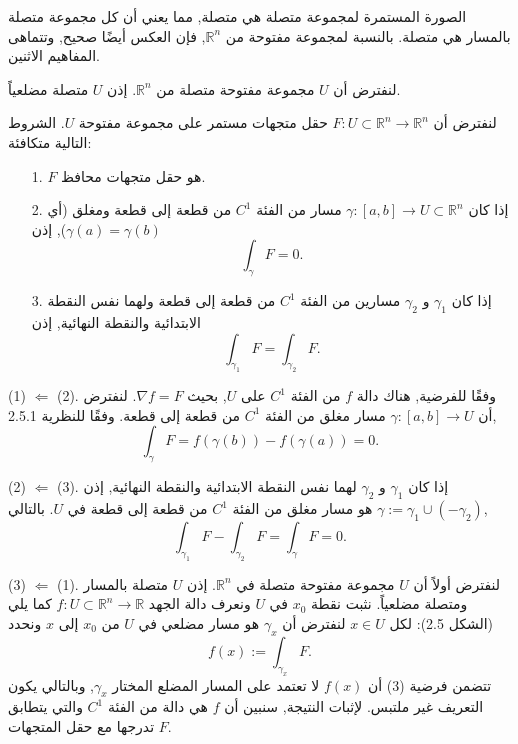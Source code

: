 الصورة المستمرة لمجموعة متصلة هي متصلة, مما يعني أن كل مجموعة متصلة بالمسار هي متصلة. بالنسبة لمجموعة مفتوحة من \( \mathbb{R}^n \), فإن العكس أيضًا صحيح, وتتماهى المفاهيم الاثنين.

\begin{theoreme}[النظرية 2.5.2]
   
لنفترض أن \( U \) مجموعة مفتوحة متصلة من \( \mathbb{R}^n \). إذن \( U \) متصلة مضلعياً.
\end{theoreme}

\begin{theoreme}[النظرية 2.5.3]
    
لنفترض أن \( F : U \subset \mathbb{R}^n \to \mathbb{R}^n \) حقل متجهات مستمر على مجموعة مفتوحة \( U \). الشروط التالية متكافئة:
\begin{enumerate}
    \item [1.] \( F \) هو حقل متجهات محافظ.
    \item [2.] إذا كان \( \gamma : [a, b] \to U \subset \mathbb{R}^n \) مسار من الفئة \( C^1 \) من قطعة إلى قطعة ومغلق (أي \( \gamma(a) = \gamma(b) \)), إذن
    \[ \int_\gamma F = 0. \]
    \item [3.] إذا كان \( \gamma_1 \) و \( \gamma_2 \) مسارين من الفئة \( C^1 \) من قطعة إلى قطعة ولهما نفس النقطة الابتدائية والنقطة النهائية, إذن
    \[ 
    \int_{\gamma_1} F = \int_{\gamma_2} F. 
    \]
\end{enumerate}
\end{theoreme}

(1) $\Leftarrow$ (2). وفقًا للفرضية, هناك دالة \( f \) من الفئة \( C^1 \) على \( U \), بحيث \( \nabla f = F \). لنفترض أن \( \gamma : [a, b] \to U \) مسار مغلق من الفئة \( C^1 \) من قطعة إلى قطعة. وفقًا للنظرية 2.5.1,
\[ \int_\gamma F = f(\gamma(b)) - f(\gamma(a)) = 0. \]

(2) $\Leftarrow$ (3). إذا كان \( \gamma_1 \) و \( \gamma_2 \) لهما نفس النقطة الابتدائية والنقطة النهائية, إذن \( \gamma := \gamma_1 \cup (-\gamma_2) \) هو مسار مغلق من الفئة \( C^1 \) من قطعة إلى قطعة في \( U \). بالتالي,
\[ \int_{\gamma_1} F - \int_{\gamma_2} F = \int_\gamma F = 0. \]

(3) $\Leftarrow$ (1). لنفترض أولاً أن \( U \) مجموعة مفتوحة متصلة في \( \mathbb{R}^n \). إذن \( U \) متصلة بالمسار ومتصلة مضلعياً. نثبت نقطة \( x_0 \) في \( U \) ونعرف دالة الجهد \( f : U \subset \mathbb{R}^n \to \mathbb{R} \) كما يلي (الشكل 2.5): لكل \( x \in U \) لنفترض أن \( \gamma_x \) هو مسار مضلعي في \( U \) من \( x_0 \) إلى \( x \) ونحدد
\[ f(x) := \int_{\gamma_x} F. \]
تتضمن فرضية (3) أن \( f(x) \) لا تعتمد على المسار المضلع المختار \( \gamma_x \), وبالتالي يكون التعريف غير ملتبس. لإثبات النتيجة, سنبين أن \( f \) هي دالة من الفئة \( C^1 \) والتي يتطابق تدرجها مع حقل المتجهات \( F \).

